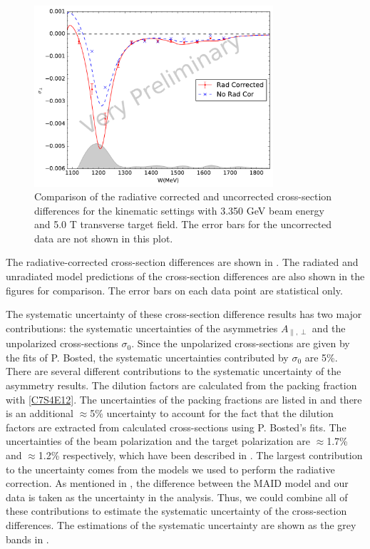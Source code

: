 \begin{figure}[tb!]
  \centering
  \includegraphics[width=0.79\textwidth]{figs/xsdiff-model-33505090.pdf}
  \caption[Cross-section differences with $E=3.350$ GeV and $B=5.0$ T.]{Comparison of the radiative corrected and uncorrected cross-section differences for the kinematic settings with 3.350 GeV beam energy and 5.0 T transverse target field. The error bars for the uncorrected data are not shown in this plot. \label{C8S3F4}}
\end{figure}

The radiative-corrected cross-section differences are shown in . The radiated and unradiated model predictions of the cross-section differences are also shown in the figures for comparison. The error bars on each data point are statistical only.

The systematic uncertainty of these cross-section difference results has two major contributions: the systematic uncertainties of the asymmetries $A_{\parallel,\perp}$ and the unpolarized cross-sections $\sigma_0$. Since the unpolarized cross-sections are given by the fits of P. Bosted, the systematic uncertainties contributed by $\sigma_0$ are 5\%. There are several different contributions to the systematic uncertainty of the asymmetry results. The dilution factors are calculated from the packing fraction with \cref{C7S4E12}. The uncertainties of the packing fractions are listed in  and there is an additional $\approx$5\% uncertainty to account for the fact that the dilution factors are extracted from calculated cross-sections using P. Bosted's fits. The uncertainties of the beam polarization and the target polarization are $\approx$1.7\% and $\approx$1.2\% respectively, which have been described in . The largest contribution to the uncertainty comes from the models we used to perform the radiative correction. As mentioned in , the difference between the MAID model and our data is taken as the uncertainty in the analysis. Thus, we could combine all of these contributions to estimate the systematic uncertainty of the cross-section differences. The estimations of the systematic uncertainty are shown as the grey bands in .


